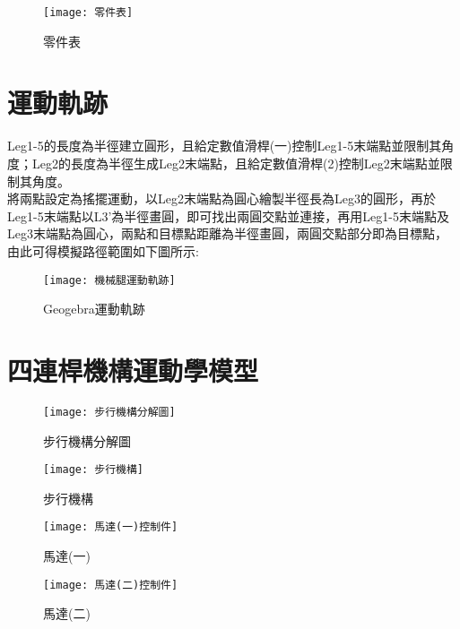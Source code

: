 \begin{figure}[hbt!]
\begin{center}
\texttt{[image: 零件表]}
\caption{\Large 零件表}\label{零件表}
\end{center}
\end{figure}

\newpage


\section{運動軌跡}
Leg1-5的長度為半徑建立圓形，且給定數值滑桿(一)控制Leg1-5末端點並限制其角度；Leg2的長度為半徑生成Leg2末端點，且給定數值滑桿(2)控制Leg2末端點並限制其角度。\\

將兩點設定為搖擺運動，以Leg2末端點為圓心繪製半徑長為Leg3的圓形，再於Leg1-5末端點以L3’為半徑畫圓，即可找出兩圓交點並連接，再用Leg1-5末端點及Leg3末端點為圓心，兩點和目標點距離為半徑畫圓，兩圓交點部分即為目標點，由此可得模擬路徑範圍如下圖所示:\\
\begin{figure}[hbt!]
\begin{center}
\texttt{[image: 機械腿運動軌跡]}
\caption{\Large Geogebra運動軌跡}\label{機械腿運動軌跡}
\end{center}
\end{figure}

\newpage

\section{四連桿機構運動學模型}

\begin{figure}[htbp]
  \begin{minipage}[t]{0.5\linewidth}
    \centering
    \texttt{[image: 步行機構分解圖]}
    \caption{步行機構分解圖}
    \label{步行機構分解圖}
  \end{minipage}
  \hfill
  \begin{minipage}[t]{0.4\linewidth}
    \centering
    \texttt{[image: 步行機構]}
    \caption{步行機構}
    \label{步行機構}
  \end{minipage}
\end{figure}

\begin{figure}[htbp]
  \begin{minipage}[t]{0.5\linewidth}
    \centering
    \texttt{[image: 馬達(一)控制件]}
    \caption{馬達(一)}
    \label{馬達(一)控制件}
  \end{minipage}
  \hfill
  \begin{minipage}[t]{0.4\linewidth}
    \centering
    \texttt{[image: 馬達(二)控制件]}
    \caption{馬達(二)}
    \label{馬達(二)控制件}
  \end{minipage}
\end{figure}

